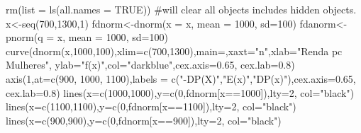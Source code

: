 \documentclass[
  letterpaper,
  DIV=11,
  numbers=noendperiod]{scrreprt}
\newenvironment{Shaded}{\begin{snugshade}}{\end{snugshade}}
\newcommand{\AttributeTok}[1]{\textcolor[rgb]{0.40,0.45,0.13}{#1}}
\newcommand{\CommentTok}[1]{\textcolor[rgb]{0.37,0.37,0.37}{#1}}
\newcommand{\ConstantTok}[1]{\textcolor[rgb]{0.56,0.35,0.01}{#1}}
\newcommand{\DecValTok}[1]{\textcolor[rgb]{0.68,0.00,0.00}{#1}}
\newcommand{\FloatTok}[1]{\textcolor[rgb]{0.68,0.00,0.00}{#1}}
\newcommand{\FunctionTok}[1]{\textcolor[rgb]{0.28,0.35,0.67}{#1}}
\newcommand{\NormalTok}[1]{\textcolor[rgb]{0.00,0.23,0.31}{#1}}
\newcommand{\OtherTok}[1]{\textcolor[rgb]{0.00,0.23,0.31}{#1}}
\newcommand{\SpecialCharTok}[1]{\textcolor[rgb]{0.37,0.37,0.37}{#1}}
\newcommand{\StringTok}[1]{\textcolor[rgb]{0.13,0.47,0.30}{#1}}
\begin{document}
\begin{Shaded}
\begin{Highlighting}[]
\FunctionTok{rm}\NormalTok{(}\AttributeTok{list =} \FunctionTok{ls}\NormalTok{(}\AttributeTok{all.names =} \ConstantTok{TRUE}\NormalTok{)) }\CommentTok{\#will clear all objects includes hidden objects.}
\NormalTok{x}\OtherTok{\textless{}{-}}\FunctionTok{seq}\NormalTok{(}\DecValTok{700}\NormalTok{,}\DecValTok{1300}\NormalTok{,}\DecValTok{1}\NormalTok{)}
\NormalTok{fdnorm}\OtherTok{\textless{}{-}}\FunctionTok{dnorm}\NormalTok{(}\AttributeTok{x =}\NormalTok{ x, }\AttributeTok{mean =} \DecValTok{1000}\NormalTok{, }\AttributeTok{sd=}\DecValTok{100}\NormalTok{)  }
\NormalTok{fdanorm}\OtherTok{\textless{}{-}}\FunctionTok{pnorm}\NormalTok{(}\AttributeTok{q =}\NormalTok{ x, }\AttributeTok{mean =} \DecValTok{1000}\NormalTok{, }\AttributeTok{sd=}\DecValTok{100}\NormalTok{)}
\FunctionTok{curve}\NormalTok{(}\FunctionTok{dnorm}\NormalTok{(x,}\DecValTok{1000}\NormalTok{,}\DecValTok{100}\NormalTok{),}\AttributeTok{xlim=}\FunctionTok{c}\NormalTok{(}\DecValTok{700}\NormalTok{,}\DecValTok{1300}\NormalTok{),}\AttributeTok{main=}\StringTok{\textquotesingle{}\textquotesingle{}}\NormalTok{,}\AttributeTok{xaxt=}\StringTok{"n"}\NormalTok{,}\AttributeTok{xlab=}\StringTok{"Renda pc Mulheres"}\NormalTok{, }\AttributeTok{ylab=}\StringTok{"f(x)"}\NormalTok{,}\AttributeTok{col=}\StringTok{"darkblue"}\NormalTok{,}\AttributeTok{cex.axis=}\FloatTok{0.65}\NormalTok{, }\AttributeTok{cex.lab=}\FloatTok{0.8}\NormalTok{) }
\FunctionTok{axis}\NormalTok{(}\DecValTok{1}\NormalTok{,}\AttributeTok{at=}\FunctionTok{c}\NormalTok{(}\DecValTok{900}\NormalTok{, }\DecValTok{1000}\NormalTok{, }\DecValTok{1100}\NormalTok{),}\AttributeTok{labels =}
       \FunctionTok{c}\NormalTok{(}\StringTok{"{-}DP(X)"}\NormalTok{,}\StringTok{"E(x)"}\NormalTok{,}\StringTok{"DP(x)"}\NormalTok{),}\AttributeTok{cex.axis=}\FloatTok{0.65}\NormalTok{, }\AttributeTok{cex.lab=}\FloatTok{0.8}\NormalTok{) }
\FunctionTok{lines}\NormalTok{(}\AttributeTok{x=}\FunctionTok{c}\NormalTok{(}\DecValTok{1000}\NormalTok{,}\DecValTok{1000}\NormalTok{),}\AttributeTok{y=}\FunctionTok{c}\NormalTok{(}\DecValTok{0}\NormalTok{,fdnorm[x}\SpecialCharTok{==}\DecValTok{1000}\NormalTok{]),}\AttributeTok{lty=}\DecValTok{2}\NormalTok{, }\AttributeTok{col=}\StringTok{"black"}\NormalTok{) }
\FunctionTok{lines}\NormalTok{(}\AttributeTok{x=}\FunctionTok{c}\NormalTok{(}\DecValTok{1100}\NormalTok{,}\DecValTok{1100}\NormalTok{),}\AttributeTok{y=}\FunctionTok{c}\NormalTok{(}\DecValTok{0}\NormalTok{,fdnorm[x}\SpecialCharTok{==}\DecValTok{1100}\NormalTok{]),}\AttributeTok{lty=}\DecValTok{2}\NormalTok{, }\AttributeTok{col=}\StringTok{"black"}\NormalTok{)}
\FunctionTok{lines}\NormalTok{(}\AttributeTok{x=}\FunctionTok{c}\NormalTok{(}\DecValTok{900}\NormalTok{,}\DecValTok{900}\NormalTok{),}\AttributeTok{y=}\FunctionTok{c}\NormalTok{(}\DecValTok{0}\NormalTok{,fdnorm[x}\SpecialCharTok{==}\DecValTok{900}\NormalTok{]),}\AttributeTok{lty=}\DecValTok{2}\NormalTok{, }\AttributeTok{col=}\StringTok{"black"}\NormalTok{)}
\end{Highlighting}
\end{Shaded}
\end{document}
